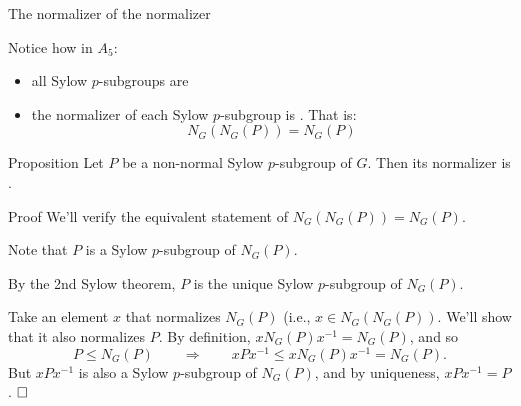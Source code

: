 \documentclass[8pt, handout]{beamer}
\newcommand{\Pause}{}      %
\begin{document}
\begin{frame}{The normalizer of the normalizer}

  Notice how in $A_5$:
  \begin{itemize}
  \item all Sylow $p$-subgroups are  \Pause
  \item the normalizer of each Sylow $p$-subgroup is . \Pause That is:
    \[
    N_G(N_G(P))=N_G(P)
    \]
  \end{itemize}

  \vspace{-2mm}\Pause
  
  \begin{block}{Proposition}
    Let $P$ be a non-normal Sylow $p$-subgroup of $G$. Then its
    normalizer is .
  \end{block}
  
  \begin{exampleblock}{Proof} \Pause
    We'll verify the equivalent statement of
    $N_G(N_G(P))=N_G(P)$. \medskip\pause

    Note that $P$ is a  Sylow $p$-subgroup of
    $N_G(P)$. \medskip\Pause

    By the 2nd Sylow theorem, $P$ is the unique Sylow $p$-subgroup of
    $N_G(P)$. \medskip\pause
    
    Take an element $x$ that normalizes $N_G(P)$ (i.e., $x\in
    N_G(N_G(P))$. \Pause We'll show that it also normalizes $P$. \Pause By
    definition, $xN_G(P)x^{-1}=N_G(P)$, and so
    \[
    P\leq N_G(P)\qquad\Longrightarrow\qquad\Pause
    xPx^{-1}\leq xN_G(P)x^{-1}=N_G(P).
    \]
    \pause But $xPx^{-1}$ is also a Sylow $p$-subgroup of $N_G(P)$,
    and by uniqueness, $xPx^{-1}=P$. $\hfill\Box$
  \end{exampleblock}

\end{frame}

\end{document}
